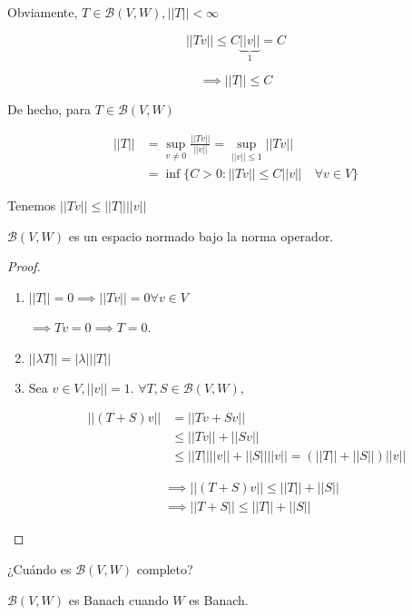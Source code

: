 \documentclass[../Apunte.tex]{subfiles}
\begin{document}
Obviamente, $T\in \mathcal{B}(V,W), ||T||<\infty$

\[||Tv||\leq C \underbrace{||v||}_1=C\]

\[\implies ||T||\leq C\]

De hecho, para $T\in \mathcal{B}(V,W)$

\begin{align*}
    ||T||&=\sup_{v\neq 0} \frac{||Tv||}{||v||}=\sup_{||v||\leq 1} ||Tv||\\
    &=\inf \{C>0:||Tv||\leq C||v||\quad \forall v\in V\}
\end{align*}

Tenemos $||Tv||\leq ||T||||v||$

\begin{ftheorem}
    $\mathcal{B}(V,W)$ es un espacio normado bajo la norma operador.
\end{ftheorem}

\begin{proof}
    \begin{enumerate}
        \item $||T||=0\implies ||Tv||=0\forall v\in V$
         
        $\implies Tv=0\implies T=0$.

        \item $||\lambda T||=|\lambda| ||T||$

        \item Sea $v\in V,||v||=1$. $\forall T,S\in\mathcal{B}(V,W),$
        
        \begin{align*}||(T+S)v||&=||Tv+Sv||\\
        &\leq ||Tv||+||Sv||\\
        &\leq ||T|| ||v||+||S|| ||v||=(||T||+||S||)||v||\end{align*}

    \begin{align*}
        &\implies ||(T+S)v||\leq ||T||+||S||\\
        &\implies ||T+S||\leq ||T||+||S||
    \end{align*}
    \end{enumerate}
\end{proof}

    ¿Cuándo es $\mathcal{B}(V,W)$ completo?

    \begin{ftheorem}
        $\mathcal{B}(V,W)$ es Banach cuando $W$ es Banach.
    \end{ftheorem}
\end{document}
